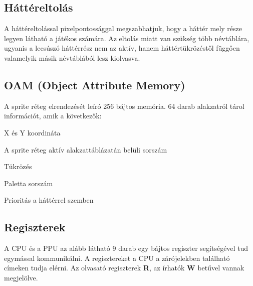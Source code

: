 \subsection{Háttéreltolás}

A háttéreltolással pixelpontossággal megszabhatjuk, hogy a háttér mely része legyen látható a játékos számára.
Az eltolás miatt van szükség több névtáblára, ugyanis a lecsúszó háttérrész nem az aktív, hanem háttértükrözéstől függően valamelyik másik névtáblából lesz kiolvasva. 

\subsection{OAM (Object Attribute Memory)}

A sprite réteg elrendezését leíró 256 bájtos memória. 64 darab alakzatról tárol információt, amik a következők:

\begin{compactitem}
	\item X és Y koordináta
	\item A sprite réteg aktív alakzattáblázatán belüli sorszám
	\item Tükrözés
	\item Paletta sorszám
	\item Prioritás a háttérrel szemben
\end{compactitem}

\subsection{Regiszterek}

A CPU és a PPU az alább látható 9 darab egy bájtos regiszter segítségével tud egymással kommunikálni. A regisztereket a CPU a zárójelekben található címeken tudja elérni.
Az olvasató regiszterek \textbf{R}, az írhatók \textbf{W} betűvel vannak megjelölve.

\vspace{0.25cm}

